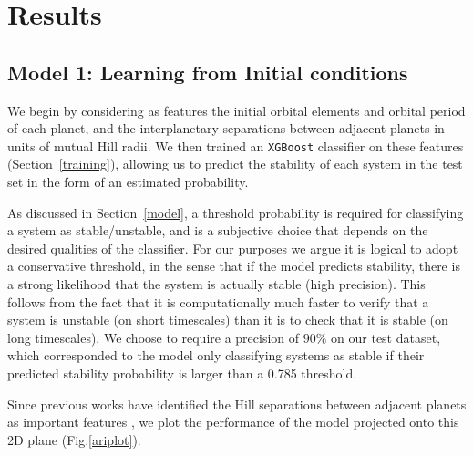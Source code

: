 \section{Results} \label{results}
\subsection{Model 1: Learning from Initial conditions} \label{IC}
We begin by considering as features the initial orbital elements and orbital period of each planet, and the interplanetary separations between adjacent planets in units of mutual Hill radii. 
We then trained an {\tt XGBoost} classifier on these features (Section~\ref{training}), allowing us to predict the stability of each system in the test set in the form of an estimated probability. 

As discussed in Section~\ref{model}, a threshold probability is required for classifying a system as stable/unstable, and is a subjective choice that depends on the desired qualities of the classifier.
For our purposes we argue it is logical to adopt a conservative threshold, in the sense that if the model predicts stability, there is a strong likelihood that the system is actually stable (high precision).
This follows from the fact that it is computationally much faster to verify that a system is unstable (on short timescales) than it is to check that it is stable (on long timescales).
We choose to require a precision of $90\%$ on our test dataset, which corresponded to the model only classifying systems as stable if their predicted stability probability is larger than a 0.785 threshold.

Since previous works have identified the Hill separations between adjacent planets as important features \citep{Chambers1996, Marzari14}, we plot the performance of the model projected onto this 2D plane (Fig.\:\ref{ariplot}).


